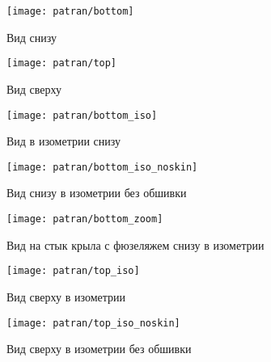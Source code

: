 \begin{figure}[H]
\centering
\texttt{[image: patran/bottom]}
\caption{Вид снизу}
\label{fig:patranBottom}
\end{figure}


\begin{figure}[H]
\centering
\texttt{[image: patran/top]}
\caption{Вид сверху}
\label{fig:patranTop}
\end{figure}


\begin{figure}[H]
\centering
\texttt{[image: patran/bottom\_iso]}
\caption{Вид в изометрии снизу}
\label{fig:patranBottomIso}
\end{figure}

\begin{figure}[H]
\centering
\texttt{[image: patran/bottom\_iso\_noskin]}
\caption{Вид снизу в изометрии без обшивки}
\label{fig:patranBottomIsoWithoutSkin}
\end{figure}

\begin{figure}[H]
\centering
\texttt{[image: patran/bottom\_zoom]}
\caption{Вид на стык крыла с фюзеляжем снизу в изометрии}
\label{fig:patranBottomIsoZoom}
\end{figure}


\begin{figure}[H]
\centering
\texttt{[image: patran/top\_iso]}
\caption{Вид сверху в изометрии}
\label{fig:patranTopIso}
\end{figure}

\begin{figure}[H]
\centering
\texttt{[image: patran/top\_iso\_noskin]}
\caption{Вид сверху в изометрии без обшивки}
\label{fig:patranTopIsoWithoutSk}
\end{figure}

%
